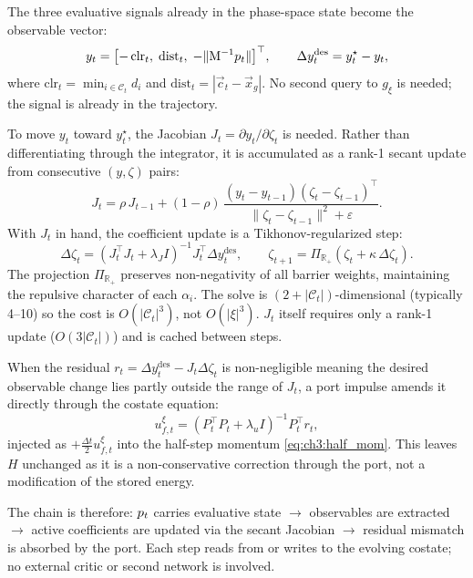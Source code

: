 The three evaluative signals already in the phase-space state become
the observable vector:
\begin{equation}
  y_t
  = \bigl[-\,\mathrm{clr}_t,\;\mathrm{dist}_t,\;-\|\mathrm{M}^{-1}p_t\|\bigr]^\top,
  \qquad
  \Delta y_t^{\mathrm{des}} = y_t^\star - y_t,
  \label{eq:ch3:obs}
\end{equation}
where $\mathrm{clr}_t = \min_{i\in\mathcal{C}_t}d_i$ and
$\mathrm{dist}_t = |\vec{c}_t - \vec{x}_g|$.
No second query to $g_\xi$ is needed; the signal is already in the
trajectory.
 
To move $y_t$ toward $y_t^\star$, the Jacobian
$J_t = \partial y_t/\partial\zeta_t$ is needed.
Rather than differentiating through the integrator, it is accumulated
as a rank-1 secant update from consecutive $(y,\zeta)$ pairs:
\begin{equation}
  J_t = \rho\,J_{t-1}
        + (1-\rho)\,
          \frac{(y_t-y_{t-1})(\zeta_t-\zeta_{t-1})^\top}
               {\|\zeta_t-\zeta_{t-1}\|^2+\varepsilon}.
  \label{eq:ch3:secant}
\end{equation}
With $J_t$ in hand, the coefficient update is a
Tikhonov-regularized step:
\begin{equation}
  \Delta\zeta_t = (J_t^\top J_t + \lambda_J I)^{-1}J_t^\top\Delta y_t^{\mathrm{des}},
  \qquad
  \zeta_{t+1} = \Pi_{\mathbb{R}_+}(\zeta_t + \kappa\,\Delta\zeta_t).
  \label{eq:ch3:tikhonov}
\end{equation}
The projection $\Pi_{\mathbb{R}_+}$ preserves non-negativity of all
barrier weights, maintaining the repulsive character of each $\alpha_i$.
The solve is $(2+|\mathcal{C}_t|)$-dimensional (typically 4--10)
so the cost is $O(|\mathcal{C}_t|^3)$, not $O(|\xi|^3)$.
$J_t$ itself requires only a rank-1 update
($O(3|\mathcal{C}_t|)$) and is cached between steps.
 
When the residual $r_t = \Delta y_t^{\mathrm{des}} - J_t\Delta\zeta_t$
is non-negligible meaning the desired observable change lies
partly outside the range of $J_t$, a port impulse amends it
directly through the costate equation:
\begin{equation}
  u_{f,t}^\xi = (P_t^\top P_t + \lambda_u I)^{-1}P_t^\top r_t,
  \label{eq:ch3:port}
\end{equation}
injected as $+\tfrac{\Delta t}{2}u_{f,t}^\xi$ into the half-step
momentum \eqref{eq:ch3:half_mom}.
This leaves $H$ unchanged as it is a non-conservative correction
through the port, not a modification of the stored energy.
 
The chain is therefore: $p_t$ carries evaluative state
$\to$ observables are extracted $\to$ active coefficients are
updated via the secant Jacobian $\to$ residual mismatch is
absorbed by the port.
Each step reads from or writes to the evolving costate; no
external critic or second network is involved.

